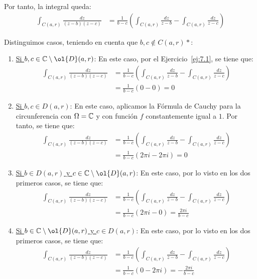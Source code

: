 \begin{ejercicio}
\begin{enumerate}
        Por tanto, la integral queda:
        \begin{align*}
            \int_{C(a,r)} \frac{dz}{(z-b)(z-c)} &= \frac{1}{b-c}\left(\int_{C(a,r)} \frac{dz}{z-b}-\int_{C(a,r)} \frac{dz}{z-c}\right)
        \end{align*}

        Distinguimos casos, teniendo en cuenta que $b,c\notin C(a,r)*$:
        \begin{enumerate}
            \item \ul{Si $b,c\in \bb{C}\setminus \ol{D}(a,r)$}: En este caso, por el Ejercicio~\ref{ej:7.1}, se tiene que:
            \begin{align*}
                \int_{C(a,r)} \frac{dz}{(z-b)(z-c)} &= \frac{1}{b-c}\left(\int_{C(a,r)} \frac{dz}{z-b}-\int_{C(a,r)} \frac{dz}{z-c}\right)\\
                &= \frac{1}{b-c}\left(0-0\right) = 0
            \end{align*}

            \item \ul{Si $b,c\in D(a,r)$}: En este caso, aplicamos la Fórmula de Cauchy para la circunferencia con $\Omega=\mathbb{C}$ y con función $f$ constantemente igual a $1$. Por tanto, se tiene que:
            \begin{align*}
                \int_{C(a,r)} \frac{dz}{(z-b)(z-c)} &= \frac{1}{b-c}\left(\int_{C(a,r)} \frac{dz}{z-b}-\int_{C(a,r)} \frac{dz}{z-c}\right)\\
                &= \frac{1}{b-c}\left(2\pi i - 2\pi i\right) = 0
            \end{align*}

            \item \ul{Si $b\in D(a,r)$ y $c\in \bb{C}\setminus \ol{D}(a,r)$}: En este caso, por lo visto en los dos primeros casos, se tiene que:
            \begin{align*}
                \int_{C(a,r)} \frac{dz}{(z-b)(z-c)} &= \frac{1}{b-c}\left(\int_{C(a,r)} \frac{dz}{z-b}-\int_{C(a,r)} \frac{dz}{z-c}\right)\\
                &= \frac{1}{b-c}\left(2\pi i - 0\right) = \frac{2\pi i}{b-c}
            \end{align*}

            \item \ul{Si $b\in \bb{C}\setminus \ol{D}(a,r)$ y $c\in D(a,r)$}: En este caso, por lo visto en los dos primeros casos, se tiene que:
            \begin{align*}
                \int_{C(a,r)} \frac{dz}{(z-b)(z-c)} &= \frac{1}{b-c}\left(\int_{C(a,r)} \frac{dz}{z-b}-\int_{C(a,r)} \frac{dz}{z-c}\right)\\
                &= \frac{1}{b-c}\left(0 - 2\pi i\right) = -\frac{2\pi i}{b-c}
            \end{align*}
        \end{enumerate}
    \end{enumerate}
\end{ejercicio}


